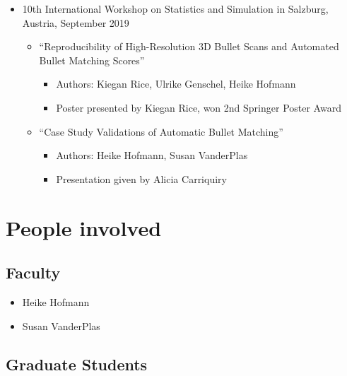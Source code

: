 \documentclass[]{book}
\providecommand{\tightlist}{%
  \setlength{\itemsep}{0pt}\setlength{\parskip}{0pt}}
\begin{document}
\begin{itemize}
\tightlist
\item
  10th International Workshop on Statistics and Simulation in Salzburg, Austria, September 2019

  \begin{itemize}
  \tightlist
  \item
    ``Reproducibility of High-Resolution 3D Bullet Scans and Automated Bullet Matching Scores''

    \begin{itemize}
    \tightlist
    \item
      Authors: Kiegan Rice, Ulrike Genschel, Heike Hofmann
    \item
      Poster presented by Kiegan Rice, won 2nd Springer Poster Award\\
    \end{itemize}
  \item
    ``Case Study Validations of Automatic Bullet Matching''

    \begin{itemize}
    \tightlist
    \item
      Authors: Heike Hofmann, Susan VanderPlas
    \item
      Presentation given by Alicia Carriquiry
    \end{itemize}
  \end{itemize}
\end{itemize}

\hypertarget{people-involved}{%
\section{People involved}\label{people-involved}}

\hypertarget{faculty}{%
\subsection{Faculty}\label{faculty}}

\begin{itemize}
\tightlist
\item
  Heike Hofmann
\item
  Susan VanderPlas
\end{itemize}

\hypertarget{graduate-students}{%
\subsection{Graduate Students}\label{graduate-students}}
\end{document}
